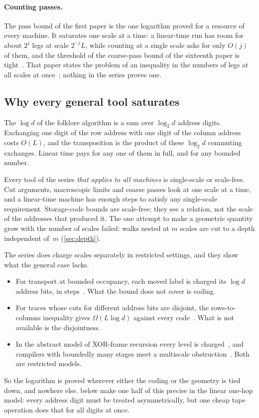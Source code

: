 \paragraph{Counting passes.} The pass bound of the first paper is the one logarithm proved for a resource of every
machine. It saturates one scale at a time: a linear-time run has room for about $2^j$ legs at scale $2^{-j}L$, while
counting at a single scale asks for only $O(j)$ of them, and the threshold of the coarse-pass bound of the sixteenth
paper is tight~\cite[Theorem~10.3 and Corollary~10.4]{SixteenthPaper2026}. That paper states the problem of an
inequality in the numbers of legs at all scales at once~\cite[Problem~11.1]{SixteenthPaper2026}; nothing in the series
proves one.

\subsection{Why every general tool saturates}\label{sec:saturation}

The $\log d$ of the folklore algorithm is a sum over $\log_2d$ address digits. Exchanging one digit of the row address
with one digit of the column address costs $O(L)$, and the transposition is the product of these $\log_2d$ commuting
exchanges. Linear time pays for any one of them in full, and for any bounded number.

Every tool of the series \emph{that applies to all machines} is single-scale or scale-free. Cut arguments, macroscopic
limits and coarse passes look at one scale at a time, and a linear-time machine has enough steps to satisfy any
single-scale requirement. Storage-code bounds are scale-free: they see a relation, not the scale of the addresses that
produced it. The one attempt to make a geometric quantity grow with the number of scales failed: walks nested at $m$
scales are cut to a depth independent of~$m$ (\cref{sec:depth}).

The series does charge scales separately in restricted settings, and they show what the general case lacks.
\begin{itemize}[leftmargin=1.5em]
\item For transport at bounded occupancy, each moved label is charged its $\log d$ address bits, in
steps~\cite[Lemma~3.4]{DirectedRecovery2026}. What the bound does not cover is coding.
\item For traces whose cuts for different address bits are disjoint, the rows-to-columns inequality gives
$\Omega(L\log d)$ against every code~\cite[Corollary~7.3]{SixteenthPaper2026}. What is not available is the
disjointness.
\item In the abstract model of XOR-frame recursion every level is charged~\cite{FirstPaper2026}, and compilers with
boundedly many stages meet a multiscale obstruction~\cite{ThirdPaper2026}. Both are restricted models.
\end{itemize}
So the logarithm is proved wherever either the coding or the geometry is tied down, and nowhere else.
 below make one half of this precise in the linear one-hop model: every address digit
must be treated asymmetrically, but one cheap tape operation does that for all digits at once.

